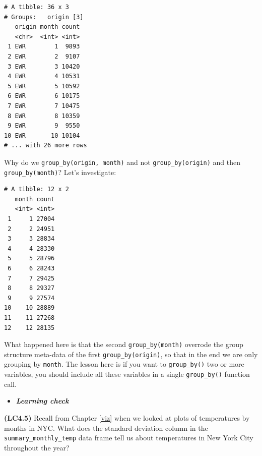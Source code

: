 \documentclass[12pt, krantz2,]{krantz}
\makeatletter
\newenvironment{Shaded}{\begin{snugshade}}{\end{snugshade}}
\newcommand{\DataTypeTok}[1]{\textcolor[rgb]{0.27,0.27,0.27}{#1}}
\newcommand{\KeywordTok}[1]{\textcolor[rgb]{0.27,0.27,0.27}{\textbf{#1}}}
\newcommand{\NormalTok}[1]{#1}
\newcommand{\OperatorTok}[1]{\textcolor[rgb]{0.43,0.43,0.43}{\textbf{#1}}}
\newcommand{\StringTok}[1]{\textcolor[rgb]{0.5,0.5,0.5}{#1}}
\newenvironment{kframe}{%
\medskip{}
\setlength{\fboxsep}{.8em}
 \def\at@end@of@kframe{}%
 \ifinner\ifhmode%
  \def\at@end@of@kframe{\end{minipage}}%
  \begin{minipage}{\columnwidth}%
 \fi\fi%
 \def\FrameCommand##1{\hskip\@totalleftmargin \hskip-\fboxsep
 \colorbox{shadecolor}{##1}\hskip-\fboxsep
     \hskip-\linewidth \hskip-\@totalleftmargin \hskip\columnwidth}%
 \MakeFramed {\advance\hsize-\width
   \@totalleftmargin\z@ \linewidth\hsize
   \@setminipage}}%
 {\par\unskip\endMakeFramed%
 \at@end@of@kframe}
\renewenvironment{Shaded}{\begin{kframe}}{\end{kframe}}
\newenvironment{rmdblock}[1]
  {\begin{shaded*}
  \begin{itemize}
  \renewcommand{\labelitemi}{
    \raisebox{-.7\height}[0pt][0pt]{
    }
  }
  \item
  }
  {
  \end{itemize}
  \end{shaded*}
  }
\newenvironment{learncheck}
  {\begin{rmdblock}{warning}}
  {\end{rmdblock}}
\makeatother
\begin{document}
\begin{verbatim}
# A tibble: 36 x 3
# Groups:   origin [3]
   origin month count
   <chr>  <int> <int>
 1 EWR        1  9893
 2 EWR        2  9107
 3 EWR        3 10420
 4 EWR        4 10531
 5 EWR        5 10592
 6 EWR        6 10175
 7 EWR        7 10475
 8 EWR        8 10359
 9 EWR        9  9550
10 EWR       10 10104
# ... with 26 more rows
\end{verbatim}

Why do we \texttt{group\_by(origin,\ month)} and not \texttt{group\_by(origin)} and then \texttt{group\_by(month)}? Let's investigate:

\begin{Shaded}
\end{Shaded}

\begin{verbatim}
# A tibble: 12 x 2
   month count
   <int> <int>
 1     1 27004
 2     2 24951
 3     3 28834
 4     4 28330
 5     5 28796
 6     6 28243
 7     7 29425
 8     8 29327
 9     9 27574
10    10 28889
11    11 27268
12    12 28135
\end{verbatim}

What happened here is that the second \texttt{group\_by(month)} overrode the group structure meta-data of the first \texttt{group\_by(origin)}, so that in the end we are only grouping by \texttt{month}. The lesson here is if you want to \texttt{group\_by()} two or more variables, you should include all these variables in a single \texttt{group\_by()} function call.

\begin{learncheck}
\textbf{\emph{Learning check}}
\end{learncheck}

\textbf{(LC4.5)} Recall from Chapter \ref{viz} when we looked at plots of temperatures by months in NYC. What does the standard deviation column in the \texttt{summary\_monthly\_temp} data frame tell us about temperatures in New York City throughout the year?
\end{document}
